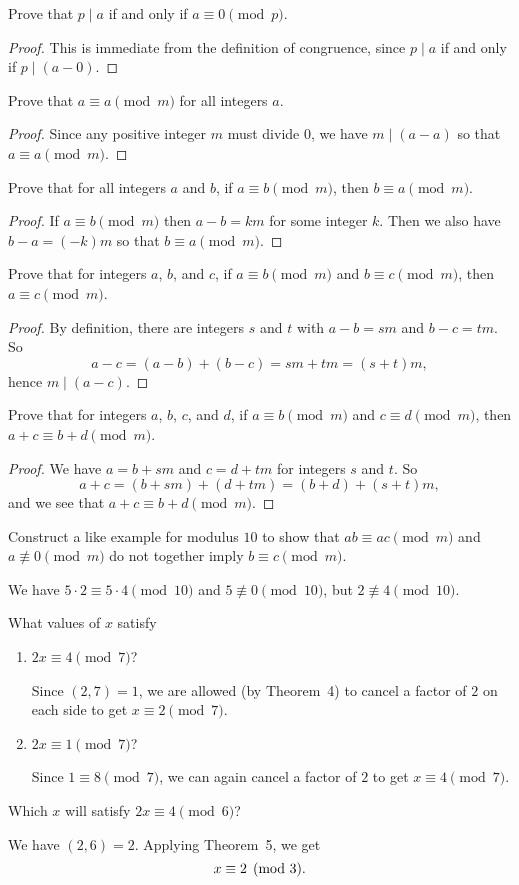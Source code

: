  Prove that $p\mid a$ if and only if $a\equiv0\pmod{p}$.
\begin{proof}
  This is immediate from the definition of congruence, since $p\mid a$
  if and only if $p\mid(a-0)$.
\end{proof}

 Prove that $a\equiv a\pmod{m}$ for all integers $a$.
\begin{proof}
  Since any positive integer $m$ must divide $0$, we have
  $m\mid(a - a)$ so that $a\equiv a\pmod{m}$.
\end{proof}

 Prove that for all integers $a$ and $b$, if
$a\equiv b\pmod{m}$, then $b\equiv a\pmod{m}$.
\begin{proof}
  If $a\equiv b\pmod{m}$ then $a - b = km$ for some integer $k$. Then
  we also have $b - a = (-k)m$ so that $b\equiv a\pmod{m}$.
\end{proof}

 Prove that for integers $a$, $b$, and $c$, if
$a\equiv b\pmod m$ and $b\equiv c\pmod m$, then $a\equiv c\pmod m$.
\begin{proof}
  By definition, there are integers $s$ and $t$ with $a - b = sm$ and
  $b - c = tm$. So
  \begin{equation*}
    a - c = (a - b) + (b - c) = sm + tm = (s + t)m,
  \end{equation*}
  hence $m\mid(a - c)$.
\end{proof}

 Prove that for integers $a$, $b$, $c$, and $d$, if
$a\equiv b\pmod m$ and $c\equiv d\pmod m$, then
$a + c\equiv b + d\pmod m$.
\begin{proof}
  We have $a = b + sm$ and $c = d + tm$ for integers $s$ and $t$. So
  \begin{equation*}
    a + c = (b + sm) + (d + tm) = (b + d) + (s + t)m,
  \end{equation*}
  and we see that $a + c\equiv b + d\pmod m$.
\end{proof}

 Construct a like example for modulus $10$ to show that
$ab\equiv ac\pmod m$ and $a\not\equiv0\pmod m$ do not together imply
$b\equiv c\pmod m$.
\begin{solution}
  We have $5\cdot2\equiv5\cdot4\pmod{10}$ and $5\not\equiv0\pmod{10}$,
  but $2\not\equiv4\pmod{10}$.
\end{solution}

 What values of $x$ satisfy
\begin{enumerate}
\item $2x\equiv4\pmod7$?
  \begin{solution}
    Since $(2,7) = 1$, we are allowed (by Theorem~4) to cancel a
    factor of $2$ on each side to get $x\equiv2\pmod7$.
  \end{solution}
\item $2x\equiv1\pmod7$?
  \begin{solution}
    Since $1\equiv8\pmod7$, we can again cancel a factor of $2$ to get
    $x\equiv4\pmod7$.
  \end{solution}
\end{enumerate}

 Which $x$ will satisfy $2x\equiv4\pmod6$?
\begin{solution}
  We have $(2,6) = 2$. Applying Theorem~5, we get
  \begin{equation*}
    x\equiv2\pmod3. \qedhere
  \end{equation*}
\end{solution}
